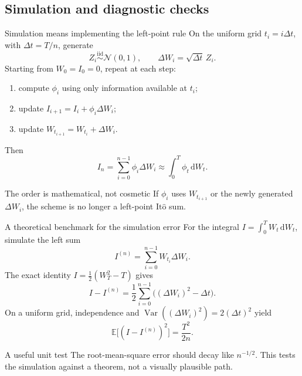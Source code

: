 \documentclass[10pt,aspectratio=169]{beamer}
\newcommand{\E}{\mathbb E}
\newcommand{\dd}{\,\mathrm d}
\newcommand{\Ito}{\mathrm{It\hat{o}}}
\DeclareMathOperator{\Var}{Var}
\begin{document}
\subsection{Simulation and diagnostic checks}

\begin{frame}{Simulation means implementing the left-point rule}
\small
On the uniform grid \(t_i=i\Delta t\), with \(\Delta t=T/n\), generate
\[
Z_i\overset{\mathrm{iid}}{\sim}\mathcal N(0,1),
\qquad
\Delta W_i=\sqrt{\Delta t}\,Z_i.
\]
Starting from \(W_0=I_0=0\), repeat at each step:
\begin{enumerate}\setlength{\itemsep}{0.45em}
  \item compute \(\phi_i\) using only information available at \(t_i\);
  \item update \(I_{i+1}=I_i+\phi_i\Delta W_i\);
  \item update \(W_{t_{i+1}}=W_{t_i}+\Delta W_i\).
\end{enumerate}
Then
\[
I_n=\sum_{i=0}^{n-1}\phi_i\Delta W_i
\approx \int_0^T\phi_t\dd W_t.
\]
\begin{block}{The order is mathematical, not cosmetic}
If \(\phi_i\) uses \(W_{t_{i+1}}\) or the newly generated \(\Delta W_i\), the scheme is no longer a left-point \(\Ito\) sum.
\end{block}
\end{frame}

\begin{frame}{A theoretical benchmark for the simulation error}
\footnotesize
For the integral \(I=\int_0^T W_t\dd W_t\), simulate the left sum
\[
I^{(n)}=\sum_{i=0}^{n-1}W_{t_i}\Delta W_i.
\]
The exact identity \(I=\tfrac12(W_T^2-T)\) gives
\[
I-I^{(n)}
=\frac12\sum_{i=0}^{n-1}\bigl((\Delta W_i)^2-\Delta t\bigr).
\]
On a uniform grid, independence and
\(\Var((\Delta W_i)^2)=2(\Delta t)^2\) yield
\[
\boxed{\E\bigl[(I-I^{(n)})^2\bigr]=\frac{T^2}{2n}.}
\]
\begin{block}{A useful unit test}
The root-mean-square error should decay like \(n^{-1/2}\). This tests the simulation against a theorem, not a visually plausible path.
\end{block}
\end{frame}
\end{document}
